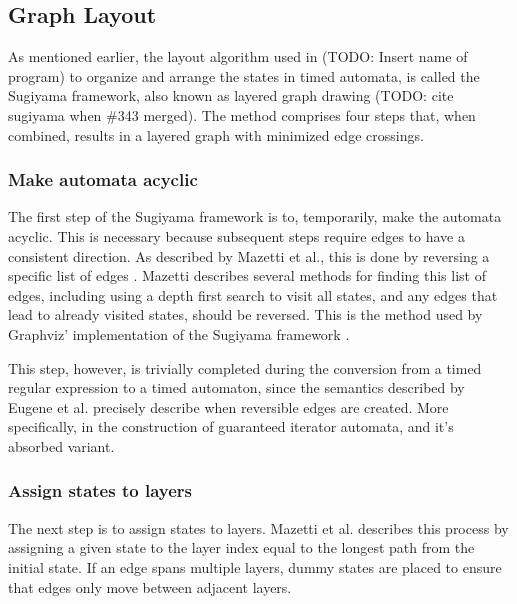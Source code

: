 \subsection{Graph Layout}


As mentioned earlier, the layout algorithm used in (TODO: Insert name of program) to organize and arrange the states in timed automata, is called the Sugiyama framework, also known as layered graph drawing (TODO: cite sugiyama when \#343 merged). The method comprises four steps that, when combined, results in a layered graph with minimized edge crossings.


\subsubsection{Make automata acyclic}
The first step of the Sugiyama framework is to, temporarily, make the automata acyclic. This is necessary because subsequent steps require edges to have a consistent direction. As described by Mazetti et al., this is done by reversing a specific list of edges \cite{Mazetti2012}.
Mazetti describes several methods for finding this list of edges, including using a depth first search to visit all states, and any edges that lead to already visited states, should be reversed.
This is the method used by Graphviz' implementation of the Sugiyama framework \cite{Graphviz}. %

This step, however, is trivially completed during the conversion from a timed regular expression to a timed automaton, since the semantics described by Eugene et al. precisely describe when reversible edges are created.
More specifically, in the construction of guaranteed iterator automata, and it's absorbed variant\cite{Eugene2001}.


\subsubsection{Assign states to layers}
The next step is to assign states to layers. Mazetti et al. describes this process by assigning a given state to the layer index equal to the longest path from the initial state. If an edge spans multiple layers, dummy states are placed to ensure that edges only move between adjacent layers. \cite{Mazetti2012}


